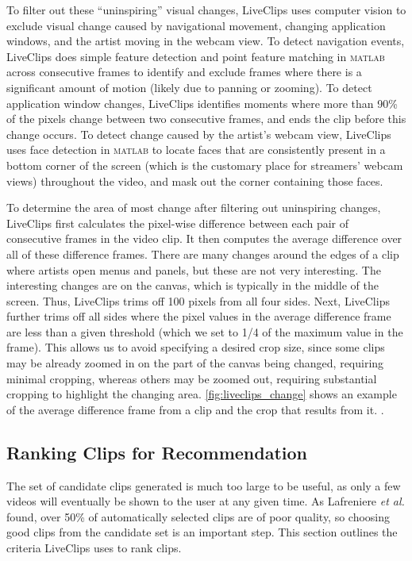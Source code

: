 To filter out these ``uninspiring'' visual changes, LiveClips uses computer vision to exclude visual change caused by navigational movement, changing application windows, and the artist moving in the webcam view. To detect navigation events, LiveClips does simple feature detection and point feature matching in \textsc{matlab} across consecutive frames to identify and exclude frames where there is a significant amount of motion (likely due to panning or zooming). To detect application window changes, LiveClips identifies moments where more than 90\% of the pixels change between two consecutive frames, and ends the clip before this change occurs. To detect change caused by the artist's webcam view, LiveClips uses face detection in \textsc{matlab} to locate faces that are consistently present in a bottom corner of the screen (which is the customary place for streamers' webcam views) throughout the video, and mask out the corner containing those faces.

To determine the area of most change after filtering out uninspiring changes, LiveClips first calculates the pixel-wise difference between each pair of consecutive frames in the video clip. It then computes the average difference over all of these difference frames. There are many changes around the edges of a clip where artists open menus and panels, but these are not very interesting. The interesting changes are on the canvas, which is typically in the middle of the screen. Thus, LiveClips trims off 100 pixels from all four sides. Next, LiveClips further trims off all sides where the pixel values in the average difference frame are less than a given threshold (which we set to 1/4 of the maximum value in the frame). This allows us to avoid specifying a desired crop size, since some clips may be already zoomed in on the part of the canvas being changed, requiring minimal cropping, whereas others may be zoomed out, requiring substantial cropping to highlight the changing area. \autoref{fig:liveclips_change} shows an example of the average difference frame from a clip and the crop that results from it.
.

\subsection{Ranking Clips for Recommendation}
The set of candidate clips generated is much too large to be useful, as only a few videos will eventually be shown to the user at any given time. As Lafreniere \textit{et al.} \cite{Lafreniere2014} found, over 50\% of automatically selected clips are of poor quality, so choosing good clips from the candidate set is an important step. This section outlines the criteria LiveClips uses to rank clips.

